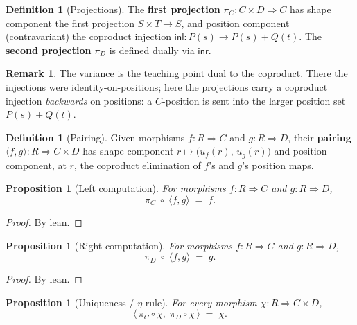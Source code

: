 \documentclass[11pt,a4paper]{article}
\theoremstyle{plain}
\newtheorem{proposition}[theorem]{Proposition}
\theoremstyle{definition}
\newtheorem{definition}[theorem]{Definition}
\newtheorem{remark}[theorem]{Remark}
\begin{document}
\begin{definition}[Projections]\label{def:fst-snd}
The \textbf{first projection} $\pi_C:C\times D\Rightarrow C$ has shape
component the first projection $S\times T\to S$, and position component
(contravariant) the coproduct injection $\mathsf{inl}:P(s)\to P(s)+Q(t)$.
The \textbf{second projection} $\pi_D$ is defined dually via $\mathsf{inr}$.
\end{definition}

\begin{remark}
The variance is the teaching point dual to the coproduct. There the injections
were identity-on-positions; here the projections carry a coproduct injection
\emph{backwards} on positions: a $C$-position is sent into the larger
position set $P(s)+Q(t)$.
\end{remark}

\begin{definition}[Pairing]\label{def:pair}
Given morphisms $f:R\Rightarrow C$ and $g:R\Rightarrow D$, their
\textbf{pairing} $\langle f,g\rangle:R\Rightarrow C\times D$ has shape
component $r\mapsto\bigl(u_f(r),\,u_g(r)\bigr)$ and position component, at
$r$, the coproduct elimination of $f$'s and $g$'s position maps.
\end{definition}

\begin{proposition}[Left computation]\label{prop:pair-fst}
For morphisms $f:R\Rightarrow C$ and $g:R\Rightarrow D$,
\begin{equation}
  \pi_C \;\circ\; \langle f,g\rangle \;=\; f.
\end{equation}
\end{proposition}

\begin{proof}
By lean.
\end{proof}

\begin{proposition}[Right computation]\label{prop:pair-snd}
For morphisms $f:R\Rightarrow C$ and $g:R\Rightarrow D$,
\begin{equation}
  \pi_D \;\circ\; \langle f,g\rangle \;=\; g.
\end{equation}
\end{proposition}

\begin{proof}
By lean.
\end{proof}

\begin{proposition}[Uniqueness / $\eta$-rule]\label{prop:pair-eta}
For every morphism $\chi:R\Rightarrow C\times D$,
\begin{equation}
  \bigl\langle\,
    \pi_C\circ\chi,\;
    \pi_D\circ\chi
  \,\bigr\rangle
  \;=\; \chi.
\end{equation}
\end{proposition}
\end{document}
